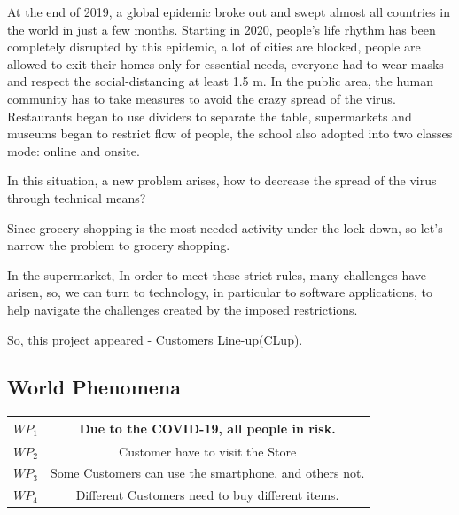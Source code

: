 \documentclass[a4paper,12pt]{report}
\begin{document}
At the end of 2019, a global epidemic broke out and swept almost all countries in the world in just a few months. Starting in 2020, people's life rhythm has been completely disrupted by this epidemic, a lot of cities are blocked, people are allowed to exit their homes only for essential needs, everyone had to wear masks and respect the social-distancing at least 1.5 m. In the public area, the human community has to take measures to avoid the crazy spread of the virus. Restaurants began to use dividers to separate the table, supermarkets and museums began to restrict flow of people, the school also adopted into two classes mode: online and onsite.

In this situation, a new problem arises, how to decrease the spread of the virus through technical means? 

Since grocery shopping is the most needed activity under the lock-down, so let’s narrow the problem to grocery shopping.

In the supermarket, In order to meet these strict rules, many challenges have arisen, so, we can turn to technology, in particular to software applications, to help navigate the challenges created by the imposed restrictions.

So, this project appeared - Customers Line-up(CLup).

\subsection{World Phenomena}

\begin{center}
	\begin{tabular}{ c|c } 
		\hline
		$WP_1$ & Due to the COVID-19, all people in risk. \\
		\hline
		$WP_2$ & Customer have to visit the Store \\
		\hline
		$WP_3$ & Some Customers can use the smartphone, and others not. \\
		\hline
		$WP_4$ & Different Customers need to buy different items. \\ 
		\hline
	\end{tabular}
\end{center}
\end{document}
